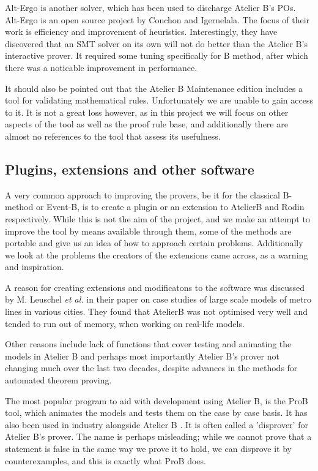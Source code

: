 \documentclass[11pt,journal]{IEEEtran}
\begin{document}
	Alt-Ergo is another solver, which has been used to discharge Atelier B's POs.\cite{Alt-Ergo} Alt-Ergo is an open source project by Conchon and Igernelala. The focus of their work is efficiency and improvement of heuristics. Interestingly, they have discovered that an SMT solver on its own will not do better than the Atelier B's interactive prover. It required some tuning specifically for B method, after which there was a noticable improvement in performance.
	
	It should also be pointed out that the Atelier B Maintenance edition includes a tool for validating mathematical rules. Unfortunately we are unable to gain access to it. It is not a great loss however, as in this project we will focus on other aspects of the tool as well as the proof rule base, and additionally there are almost no references to the tool that assess its usefulness.
	
	\subsection{Plugins, extensions and other software}
	
	A very common approach to improving the provers, be it for the classical B-method or Event-B, is to create a plugin or an extension to AtelierB and Rodin respectively. While this is not the aim of the project, and we make an attempt to improve the tool by means available through them, some of the methods are portable and give us an idea of how to approach certain problems. Additionally we look at the problems the creators of the extensions came across, as a warning and inspiration.
	
	A reason for creating extensions and modificatons to the software was discussed by M. Leuschel \emph{et al.} in their paper on case studies of large scale models of metro lines in various cities\cite{San Juan metro}. They found that AtelierB was not optimised very well and tended to run out of memory, when working on real-life models.
	
	Other reasons include lack of functions that cover testing and animating the models in Atelier B and perhaps most importantly Atelier B's prover not changing much over the last two decades, despite advances in the methods for automated theorem proving.
	
	The most popular program to aid with development using Atelier B, is the ProB tool, which animates the models and tests them on the case by case basis.\cite{ProB} It has also been used in industry alongside Atelier B \cite{San Juan metro}. It is often called a 'disprover' for Atelier B's prover. The name is perhaps misleading; while we cannot prove that a statement is false in the same way we prove it to hold, we can disprove it by counterexamples, and this is exactly what ProB does.
	
\end{document}
